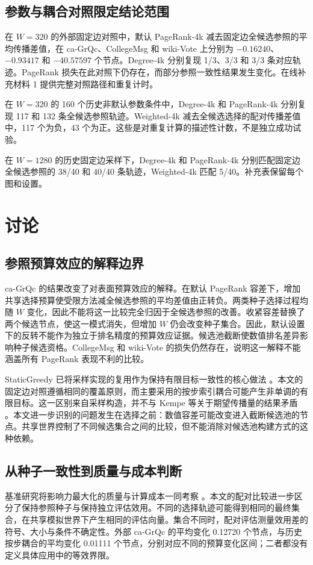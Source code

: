 \documentclass[smallextended]{svjour3}
\begin{document}
\subsection{参数与耦合对照限定结论范围}

在 $W=320$ 的外部固定边对照中，默认 PageRank-4k 减去固定边全候选参照的平均传播差值，在 ca-GrQc、CollegeMsg 和 wiki-Vote 上分别为 $-0.16240$、$-0.93417$ 和 $-40.57597$ 个节点。Degree-4k 分别复现 1/3、3/3 和 3/3 条对应轨迹。PageRank 损失在此对照下仍存在，而部分参照一致性结果发生变化。在线补充材料 1 提供完整对照路径和重复计时。

在 $W=320$ 的 160 个历史非默认参数条件中，Degree-4k 和 PageRank-4k 分别复现 117 和 132 条全候选参照轨迹。Weighted-4k 减去全候选选择的配对传播差值中，117 个为负，43 个为正。这些是对重复计算的描述性计数，不是独立成功试验。

在 $W=1280$ 的历史固定边采样下，Degree-4k 和 PageRank-4k 分别匹配固定边全候选参照的 38/40 和 40/40 条轨迹，Weighted-4k 匹配 5/40。补充表保留每个图和设置。
\FloatBarrier

\section{讨论}
\subsection{参照预算效应的解释边界}
ca-GrQc 的结果改变了对表面预算效应的解释。在默认 PageRank 容差下，增加共享选择预算使受限方法减全候选参照的平均差值由正转负。两类种子选择过程均随 $W$ 变化，因此不能将这一比较完全归因于全候选参照的改善。收紧容差替换了两个候选节点，使这一模式消失，但增加 $W$ 仍会改变种子集合。因此，默认设置下的反转不能作为独立于排名精度的预算效应证据。候选池截断使数值排名差异影响种子候选资格。CollegeMsg 和 wiki-Vote 的损失仍然存在，说明这一解释不能涵盖所有 PageRank 表现不利的比较。

StaticGreedy 已将采样实现的复用作为保持有限目标一致性的核心做法 \cite{ref8}。本文的固定边对照遵循相同的覆盖原则，而主要采用的按步索引耦合可能产生非单调的有限目标。这一区别来自采样构造，并不与 Kempe 等关于期望传播量的结果矛盾 \cite{ref1}。本文进一步识别的问题发生在选择之前：数值容差可能改变进入截断候选池的节点。共享世界控制了不同候选集合之间的比较，但不能消除对候选池构建方式的这种依赖。

\subsection{从种子一致性到质量与成本判断}
基准研究将影响力最大化的质量与计算成本一同考察 \cite{ref16}。本文的配对比较进一步区分了保持参照种子与保持独立评估效用。不同的选择轨迹可能得到相同的最终集合，在共享模拟世界下产生相同的评估向量。集合不同时，配对评估测量效用差的符号、大小与条件不确定性。外部 ca-GrQc 的平均变化 0.12720 个节点，与历史按步耦合的平均变化 0.01111 个节点，分别对应不同的预算变化区间；二者都没有定义具体应用中的等效界限。
\end{document}
